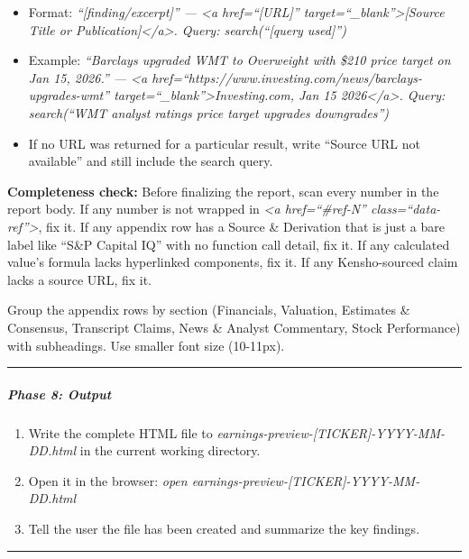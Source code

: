 \documentclass[11pt]{article}
\begin{document}
\begin{itemize}[leftmargin=*,itemsep=2pt,topsep=2pt]
\begin{itemize}[leftmargin=*,itemsep=2pt,topsep=2pt]
\item {} Format: \emph{``[finding/excerpt]'' — <a href=``[URL]'' target=``\_\allowbreak{}blank''>[Source Title or Publication]</a>. Query: search(``[query used]'')}
\item {} Example: \emph{``Barclays upgraded WMT to Overweight with \$210 price target on Jan 15, 2026.'' — <a href=``https://www.investing.com/news/barclays-upgrades-wmt'' target=``\_\allowbreak{}blank''>Investing.com, Jan 15 2026</a>. Query: search(``WMT analyst ratings price target upgrades downgrades'')}
\item {} If no URL was returned for a particular result, write ``Source URL not available'' and still include the search query.
\end{itemize}
\end{itemize}

\textbf{Completeness check:} Before finalizing the report, scan every number in the report body. If any number is not wrapped in \emph{<a href=``\#ref-N'' class=``data-ref''>}, fix it. If any appendix row has a Source \& Derivation that is just a bare label like ``S\&P Capital IQ'' with no function call detail, fix it. If any calculated value's formula lacks hyperlinked components, fix it. If any Kensho-sourced claim lacks a source URL, fix it.


Group the appendix rows by section (Financials, Valuation, Estimates \& Consensus, Transcript Claims, News \& Analyst Commentary, Stock Performance) with subheadings. Use smaller font size (10-11px).


\vspace{0.5em}\hrule\vspace{0.5em}

\subparagraph{Phase 8: Output}\mbox{}\par

\begin{enumerate}[leftmargin=*,itemsep=2pt,topsep=2pt]
\item {} Write the complete HTML file to \emph{earnings-preview-[TICKER]-YYYY-MM-DD.html} in the current working directory.
\item {} Open it in the browser: \emph{open earnings-preview-[TICKER]-YYYY-MM-DD.html}
\item {} Tell the user the file has been created and summarize the key findings.
\end{enumerate}

\vspace{0.5em}\hrule\vspace{0.5em}
\end{document}
